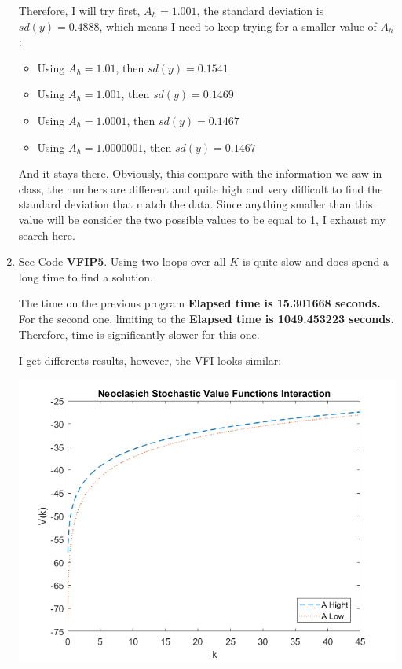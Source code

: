 \documentclass[12pt]{article}%
\begin{document}
\begin{enumerate}
	 Therefore, I will try first, $A_h=1.001$, the standard deviation is $sd(y)=0.4888$, which means I need to keep trying for a smaller value of $A_h$: 
	 
	 \begin{itemize}
	 		\item Using $A_h=1.01$, then  $sd(y)=0.1541$
	 	\item Using $A_h=1.001$, then  $sd(y)=0.1469$
	 	\item Using $A_h=1.0001$, then  $sd(y)=0.1467$
	 	\item Using $A_h=1.0000001$, then  $sd(y)=0.1467$
	 \end{itemize}
 
 And it stays there. Obviously, this compare with the information we saw in class, the numbers are different and quite high and very difficult to find the standard deviation that match the data. Since anything smaller than this value will be consider the two possible values to be equal to 1, I exhaust my search here. 
	
	\item See Code \textbf{VFIP5}. Using two loops over all $K$ is quite slow and does spend a long time to find a solution. 
	
	The time on the previous program \textbf{Elapsed time is 15.301668 seconds.}
	For the second one, limiting to the  \textbf{Elapsed time is 1049.453223 seconds.} Therefore, time is significantly slower for this one. 
	
 I get differents results, however, the VFI looks similar: 
	
	\begin{center}
		\includegraphics[width=1\linewidth]{VFP5}
	\end{center}
	
\end{enumerate}

\strut

\onehalfspacing
\end{document}
